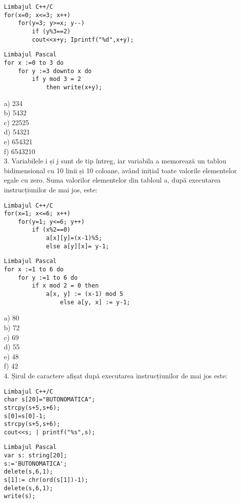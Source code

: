 \begin{verbatim}
Limbajul C++/C
for(x=0; x<=3; x++)
    for(y=3; y>=x; y--)
        if (y%3==2)
        cout<<x+y; Iprintf("%d",x+y);
\end{verbatim}

\begin{verbatim}
Limbajul Pascal
for x :=0 to 3 do
    for y :=3 downto x do
        if y mod 3 = 2
            then write(x+y);
\end{verbatim}

a) 234\\
b) 5432\\
c) 22525\\
d) 54321\\
e) 654321\\
f) 6543210\\
3. Variabilele i și j sunt de tip întreg, iar variabila a memorează un tablou bidimensional cu 10 linii și 10 coloane, având inițial toate valorile elementelor egale cu zero. Suma valorilor elementelor din tabloul a, după executarea instrucțiunilor de mai jos, este:

\begin{verbatim}
Limbajul C++/C
for(x=1; x<=6; x++)
    for(y=1; y<=6; y++)
        if (x%2==0)
            a[x][y]=(x-1)%5;
            else a[y][x]= y-1;
\end{verbatim}

\begin{verbatim}
Limbajul Pascal
for x :=1 to 6 do
    for y :=1 to 6 do
        if x mod 2 = 0 then
            a[x, y] := (x-1) mod 5
                else a[y, x] := y-1;
\end{verbatim}

a) 80\\
b) 72\\
c) 69\\
d) 55\\
e) 48\\
f) 42\\
4. Șirul de caractere afișat după executarea instrucțiunilor de mai jos este:

\begin{verbatim}
Limbajul C++/C
char s[20]="BUTONOMATICA";
strcpy(s+5,s+6);
s[0]=s[0]-1;
strcpy(s+5,s+6);
cout<<s; | printf("%s",s);
\end{verbatim}

\begin{verbatim}
Limbajul Pascal
var s: string[20];
s:='BUTONOMATICA';
delete(s,6,1);
s[1]:= chr(ord(s[1])-1);
delete(s,6,1);
write(s);
\end{verbatim}

